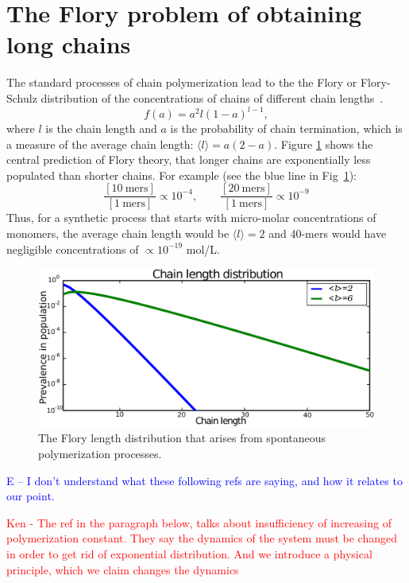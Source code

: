 \documentclass[journal=jacsat,manuscript=article,layout=twocolumn]{achemso}
\newcommand*{\pq}[1]{\left[ #1 \right]}
\newcommand*{\red}[1]{\textcolor{red}{#1}}
\newcommand*{\blue}[1]{\textcolor{blue}{#1}}
\begin{document}
\section{The Flory problem of obtaining long chains}
\label{sec:flory} 
The standard processes of chain polymerization lead to the the Flory or Flory-Schulz distribution of the concentrations of chains of different chain lengths~\cite{Flory1953}. 
\begin{equation}
 f(a)=a^2l(1-a)^{l-1},
\end{equation} 
where $l$ is the chain length and $a$ is the probability of chain termination, which is a measure of the average chain length: $\langle l \rangle = a(2- a)$.
Figure \ref{fig:flory} shows the central prediction of Flory theory, that longer chains are exponentially less populated than shorter chains.  For example (see the blue line in Fig~\ref{fig:flory}):
\begin{equation}
  \frac{\pq{10~\mathrm{mers}}}{\pq{1~\mathrm{mers}}}\propto10^{-4},\qquad\frac{\pq{20~\mathrm{mers}}}{\pq{1~\mathrm{mers}}}\propto10^{-9}
\end{equation} 
Thus, for a synthetic process that starts with micro-molar concentrations of monomers, the 
average chain length would be $\langle l \rangle = 2$ and 40-mers would have 
negligible concentrations of $\propto 10^{-19} $ mol/L. 
\begin{figure}[h!]
  \centering
  \includegraphics[width=\columnwidth]{pictures/flory2.pdf} 
  \caption{The Flory length distribution that arises from spontaneous polymerization processes.}
  \label{fig:flory}
\end{figure}

\blue{E -- I don't understand what these following refs are saying, and how it relates to our 
point.}

 \red{Ken - The ref in the paragraph below, talks about insufficiency of increasing of 
polymerization constant. They say the dynamics of the system must be changed in order to get rid of 
exponential distribution. And we introduce a physical principle, which we claim changes the 
dynamics}
\end{document}
